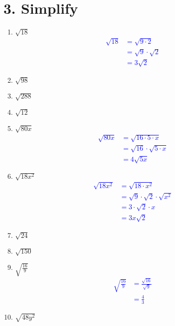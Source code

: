 \documentclass{hw}
\begin{document}
\section*{\normalsize 3. Simplify}
\begin{enumerate}[label=\alph*.]
    \item $\sqrt{18}$
        \textcolor{blue}{
        \begin{align*}
        \sqrt{18} &= \sqrt{9 \cdot 2} \\
                    &= \sqrt{9} \cdot \sqrt{2} \\
                    &= 3 \sqrt{2}
        \end{align*}
        }
    \item $\sqrt{98}$
        \studentworkspace
    \item $\sqrt{288}$
        \studentworkspace
    \item $\sqrt{12}$
        \studentworkspace
    \item $\sqrt{80x}$
        \textcolor{blue}{
        \begin{align*}
        \sqrt{80x} &= \sqrt{16 \cdot 5 \cdot x} \\
                   &= \sqrt{16} \cdot \sqrt{5 \cdot x} \\
                   &= 4 \sqrt{5x}
        \end{align*}
        }
    \item $\sqrt{18x^2}$
        \textcolor{blue}{
        \begin{align*}
        \sqrt{18x^2} &= \sqrt{18 \cdot x^2} \\
                     &= \sqrt{9} \cdot \sqrt{2} \cdot \sqrt{x^2} \\
                     &= 3 \cdot \sqrt{2} \cdot x \\
                     &= 3x\sqrt{2}
        \end{align*}
        }
    \item $\sqrt{24}$
        \studentworkspace
    \item $\sqrt{150}$
        \studentxlargeworkspace
    \item $\sqrt{\frac{16}{9}}$
        \textcolor{blue}{
        \begin{align*}
        \sqrt{\frac{16}{9}} &= \frac{\sqrt{16}}{\sqrt{9}} \\
                            &= \frac{4}{3}
        \end{align*}
        }
    \item $\sqrt{48y^2}$
        \studentworkspace

\end{enumerate}
\end{document}
